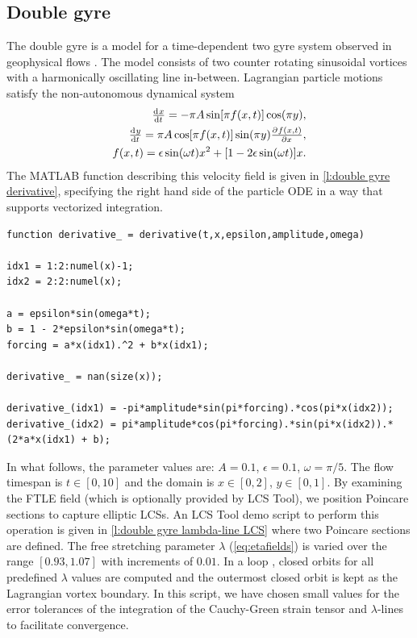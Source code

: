 \documentclass{article}
\begin{document}
\subsection{Double gyre}
The double gyre is a model for a time-dependent two gyre system observed in geophysical flows \parencite{shadden05:_defin_lagran_lyapun}. The model consists of two counter rotating sinusoidal vortices with a harmonically oscillating line in-between. Lagrangian particle motions satisfy the non-autonomous dynamical system
\begin{equation}
\begin{split}
\od{x}{t} = -\pi A \sin[\pi f(x,t)] \cos(\pi y),\\
\od{y}{t} = \pi A \cos[\pi f(x,t)] \sin(\pi y) \pd{f(x,t)}{x},\\
f(x,t) = \epsilon \sin(\omega t) x^2 + [1 - 2 \epsilon \sin(\omega t)] x.
\end{split}
\label{eq:double gyre derivative equations}
\end{equation}
The MATLAB function describing this velocity field is given in \cref{l:double gyre derivative}, specifying the right hand side of the particle ODE in a way that supports vectorized integration.

\begin{lstlisting}[caption={Double gyre derivative function corresponding to \cref{eq:double gyre derivative equations}.},label=l:double gyre derivative]
function derivative_ = derivative(t,x,epsilon,amplitude,omega)

idx1 = 1:2:numel(x)-1;
idx2 = 2:2:numel(x);

a = epsilon*sin(omega*t);
b = 1 - 2*epsilon*sin(omega*t);
forcing = a*x(idx1).^2 + b*x(idx1);

derivative_ = nan(size(x));

derivative_(idx1) = -pi*amplitude*sin(pi*forcing).*cos(pi*x(idx2));
derivative_(idx2) = pi*amplitude*cos(pi*forcing).*sin(pi*x(idx2)).*(2*a*x(idx1) + b);
\end{lstlisting}

In what follows, the parameter values are: $A = 0.1$, $\epsilon = 0.1$, $\omega = \pi/5$. The flow timespan is $t \in [0,10]$ and the domain is $x \in [0,2]$, $y \in [0,1]$. By examining the FTLE field (which
is optionally provided by LCS Tool), we position Poincare sections to capture elliptic LCSs. An LCS Tool demo script to perform this operation is given in \cref{l:double gyre lambda-line LCS} where two Poincare sections are defined. The free stretching parameter $\lambda$ (\cref{eq:etafields}) is varied over the range $[0.93,1.07]$ with increments of $0.01$. In a loop , closed orbits for all predefined $\lambda$ values are computed and the outermost closed orbit is kept as the Lagrangian vortex boundary. In this script, we have chosen small values for the error tolerances of the integration of the Cauchy-Green strain tensor and $\lambda$-lines to facilitate convergence.
\end{document}
